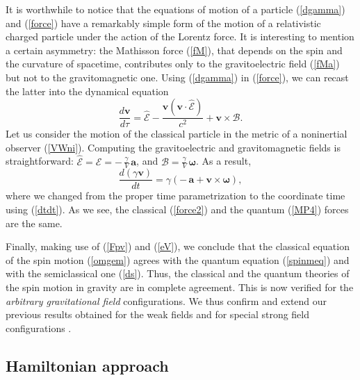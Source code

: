 \documentclass[preprint,showpacs,preprintnumbers,eqsecnum,amsmath,amssymb]{revtex4-1}
\begin{document}
It is worthwhile to notice that the equations of motion of a particle
(\ref{dgamma}) and (\ref{force}) have a remarkably simple form of the
motion of a relativistic charged particle under the action of the
Lorentz force. It is interesting to mention a certain asymmetry: the
Mathisson force (\ref{fM}), that depends on the spin and the curvature
of spacetime, contributes only to the gravitoelectric field (\ref{fMa})
but not to the gravitomagnetic one. Using (\ref{dgamma}) in (\ref{force}),
we can recast the latter into the dynamical equation
\begin{equation}\label{MP}
{\frac {d\bm{v}}{d\tau}} = \widehat{\bm{\mathcal{E}}} - {\frac {\bm{v}(\bm{v}
\cdot\widehat{\bm{\mathcal{E}}})} {c^2}} + \bm{v}\times\bm{\mathcal{B}}. 
\end{equation}
Let us consider the motion of the classical particle in the metric of a 
noninertial observer (\ref{VWni}). Computing the gravitoelectric and 
gravitomagnetic fields is straightforward: $\widehat{\bm{\mathcal{E}}} = 
\bm{\mathcal E} = -\,{\frac \gamma V}\,\bm{a}$, and $\bm{\mathcal B} = 
{\frac \gamma V}\,\bm{\omega}$. As a result, 
\begin{equation}
{\frac {d(\gamma\bm{v})}{dt}} = \gamma\left(-\,\bm{a} + \bm{v}\times\bm{\omega}
\right),\label{force2}
\end{equation}
where we changed from the proper time parametrization to the coordinate time
using (\ref{dtdt}). As we see, the classical (\ref{force2}) and the quantum 
(\ref{MP4}) forces are the same. 

Finally, making use of (\ref{Fpv}) and (\ref{eV}),
we conclude that the classical equation of the spin motion (\ref{omgem})
agrees with the quantum equation (\ref{spinmeq}) and with the
semiclassical one (\ref{ds}). Thus, the classical and the quantum
theories of the spin motion in gravity are in complete agreement.
This is now verified for the {\it arbitrary gravitational field}
configurations. We thus confirm and extend our previous results
obtained for the weak fields \cite{OST} and for special strong field
configurations \cite{ostrong}.


\subsection{Hamiltonian approach}\label{canonical}
\end{document}
